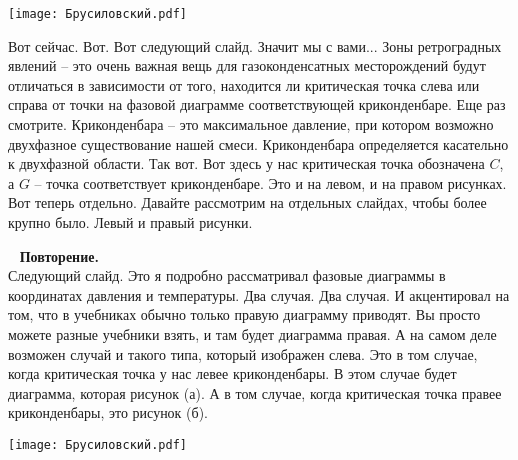 \documentclass[main.tex]{subfiles}
\begin{document}
\begin{center}
\texttt{[image: Брусиловский.pdf]}
\end{center}

Вот сейчас.
Вот.
Вот следующий слайд.
Значит мы с вами...
Зоны ретроградных явлений -- это очень важная вещь для газоконденсатных месторождений будут отличаться в зависимости от того, находится ли критическая точка слева или справа от точки на фазовой диаграмме соответствующей криконденбаре.
Еще раз смотрите.
Криконденбара -- это максимальное давление, при котором возможно двухфазное существование нашей смеси.
Криконденбара определяется касательно к двухфазной области.
Так вот.
Вот здесь у нас критическая точка обозначена $C$, а $G$ -- точка соответствует криконденбаре.
Это и на левом, и на правом рисунках.
Вот теперь отдельно.
Давайте рассмотрим на отдельных слайдах, чтобы более крупно
было.
Левый и правый рисунки.

\ \newline
\textbf{Повторение.}\\
Следующий слайд.
Это я подробно рассматривал фазовые диаграммы в координатах давления и температуры.
Два случая. Два случая. И акцентировал на том, что в учебниках обычно только правую диаграмму приводят.
Вы просто можете разные учебники взять, и там будет диаграмма правая.
А на самом деле возможен случай и такого типа, который изображен слева.
Это в том случае, когда критическая точка у нас левее криконденбары.
В этом случае будет диаграмма, которая рисунок (а).
А в том случае, когда критическая точка правее криконденбары, это рисунок (б).

\begin{center}
\texttt{[image: Брусиловский.pdf]}
\end{center}
\end{document}
